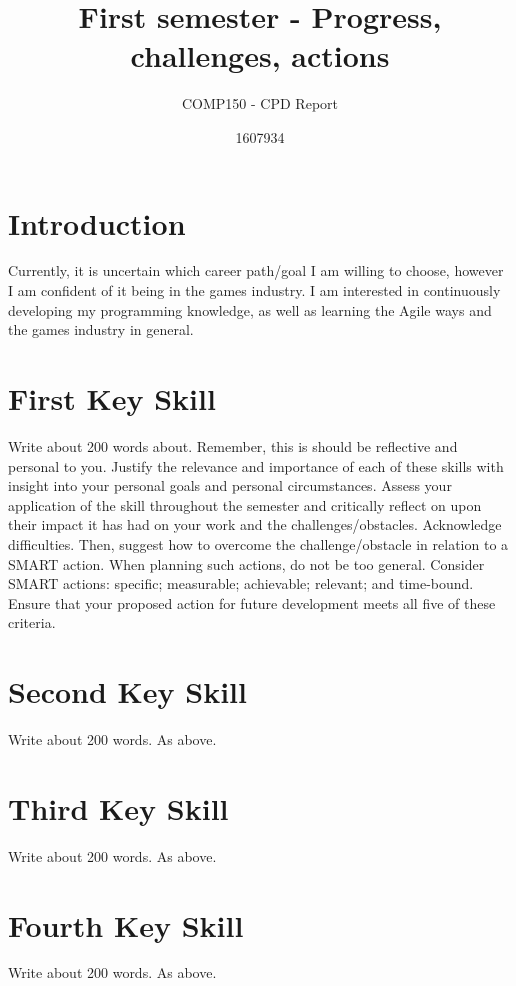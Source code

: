 \documentclass{scrartcl}
\title{First semester - Progress, challenges, actions}
\subtitle{COMP150 - CPD Report}
\author{1607934}
\begin{document}
\maketitle

\section{Introduction}

Currently, it is uncertain which career path/goal I am willing to choose, however I am confident of it being in the games industry. I am interested in continuously developing my programming knowledge, as well as learning the Agile ways and the games industry in general. 

\section{First Key Skill}

Write about 200 words about. Remember, this is should be reflective and personal to you. Justify the relevance and importance of each of these skills with insight into your personal goals and personal circumstances. Assess your application of the skill throughout the semester and critically reflect on upon their impact it has had on your work and the challenges/obstacles. Acknowledge difficulties. Then, suggest how to overcome the challenge/obstacle in relation to a SMART action. When planning such actions, do not be too general. Consider SMART actions:
specific; measurable; achievable; relevant; and time-bound. Ensure that your proposed action for future development meets all five of these criteria.

\section{Second Key Skill}

Write about 200 words. As above.

\section{Third Key Skill}

Write about 200 words. As above.

\section{Fourth Key Skill}

Write about 200 words. As above.
\end{document}
